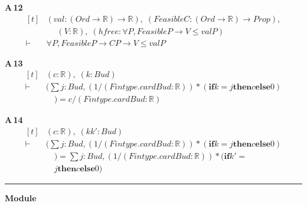 \noindent\textbf{A\,12}\quad{}
{\footnotesize\[ \begin{aligned}[t]
&(\mathit{val} : (\mathit{Ord} \to \mathbb{R} ) \to \mathbb{R} ),\; (\mathit{Feasible} \mathit{C} : (\mathit{Ord} \to \mathbb{R} ) \to \mathit{Prop}),\\
&\quad \; (\mathit{V} : \mathbb{R} ),\; (\mathit{hfree} : \forall \mathit{P}, \mathit{Feasible} \mathit{P} \to \mathit{V} \leq \mathit{val} \mathit{P})\\
\vdash\;&\forall \mathit{P}, \mathit{Feasible} \mathit{P} \to \mathit{C} \mathit{P} \to \mathit{V} \leq \mathit{val} \mathit{P}
\end{aligned} \]}

\noindent\textbf{A\,13}\quad{}
{\footnotesize\[ \begin{aligned}[t]
&(\mathit{c} : \mathbb{R} ),\; (\mathit{k} : \mathit{Bud})\\
\vdash\;&(\textstyle\sum \mathit{j} : \mathit{Bud}, (1 / (\mathit{Fintype}.\mathit{card} \mathit{Bud} : \mathbb{R} )) * (\mathbf{if} \mathit{k} = \mathit{j} \mathbf{then} \mathit{c} \mathbf{else} 0)\\
&\quad ) = \mathit{c} / (\mathit{Fintype}.\mathit{card} \mathit{Bud} : \mathbb{R} )
\end{aligned} \]}

\noindent\textbf{A\,14}\quad{}
{\footnotesize\[ \begin{aligned}[t]
&(\mathit{c} : \mathbb{R} ),\; (\mathit{k} \mathit{k'} : \mathit{Bud})\\
\vdash\;&(\textstyle\sum \mathit{j} : \mathit{Bud}, (1 / (\mathit{Fintype}.\mathit{card} \mathit{Bud} : \mathbb{R} )) * (\mathbf{if} \mathit{k} = \mathit{j} \mathbf{then} \mathit{c} \mathbf{else} 0)\\
&\quad ) = \textstyle\sum \mathit{j} : \mathit{Bud}, (1 / (\mathit{Fintype}.\mathit{card} \mathit{Bud} : \mathbb{R} )) * (\mathbf{if} \mathit{k'} =\\
&\quad \mathit{j} \mathbf{then} \mathit{c} \mathbf{else} 0)
\end{aligned} \]}

\vspace{4pt}\noindent\rule{\columnwidth}{0.4pt}\par\vspace{2pt}
\noindent\textbf{Module }\par\vspace{3pt}

